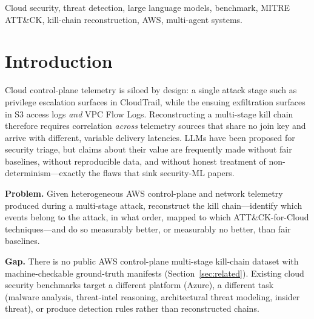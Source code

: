 \documentclass[journal]{IEEEtran}
\begin{document}
\begin{IEEEkeywords}
Cloud security, threat detection, large language models, benchmark, MITRE ATT\&CK,
kill-chain reconstruction, AWS, multi-agent systems.
\end{IEEEkeywords}

\section{Introduction}\label{sec:intro}
Cloud control-plane telemetry is siloed by design: a single attack stage such as
privilege escalation surfaces in CloudTrail, while the ensuing exfiltration surfaces
in S3 access logs \emph{and} VPC Flow Logs. Reconstructing a multi-stage kill chain
therefore requires correlation \emph{across} telemetry sources that share no join key
and arrive with different, variable delivery latencies. LLMs have been proposed for
security triage, but claims about their value are frequently made without fair
baselines, without reproducible data, and without honest treatment of
non-determinism---exactly the flaws that sink security-ML papers.

\textbf{Problem.} Given heterogeneous AWS control-plane and network telemetry produced
during a multi-stage attack, reconstruct the kill chain---identify which events belong
to the attack, in what order, mapped to which ATT\&CK-for-Cloud techniques---and do so
measurably better, or measurably no better, than fair baselines.

\textbf{Gap.} There is no public AWS control-plane multi-stage kill-chain dataset with
machine-checkable ground-truth manifests (Section~\ref{sec:related}). Existing cloud
security benchmarks target a different platform (Azure), a different task (malware
analysis, threat-intel reasoning, architectural threat modeling, insider threat), or
produce detection rules rather than reconstructed chains.
\end{document}
